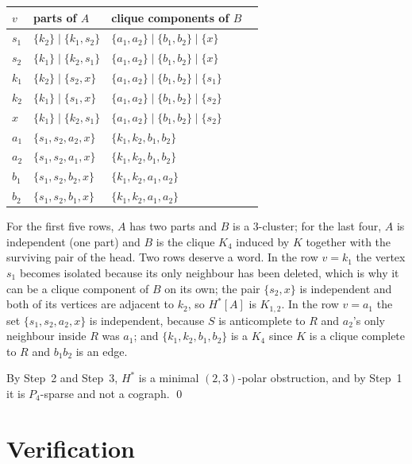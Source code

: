 \documentclass[11pt]{amsart}
\theoremstyle{definition}
\theoremstyle{remark}
\newcommand{\Hstar}{H^{*}}
\begin{document}
\medskip
\begin{center}
\renewcommand{\arraystretch}{1.15}
\begin{tabular}{llll}
$v$ & parts of $A$ & clique components of $B$ & \\
\hline
$s_1$ & $\{k_2\}\mid\{k_1,s_2\}$ & $\{a_1,a_2\}\mid\{b_1,b_2\}\mid\{x\}$ & \\
$s_2$ & $\{k_1\}\mid\{k_2,s_1\}$ & $\{a_1,a_2\}\mid\{b_1,b_2\}\mid\{x\}$ & \\
$k_1$ & $\{k_2\}\mid\{s_2,x\}$   & $\{a_1,a_2\}\mid\{b_1,b_2\}\mid\{s_1\}$ & \\
$k_2$ & $\{k_1\}\mid\{s_1,x\}$   & $\{a_1,a_2\}\mid\{b_1,b_2\}\mid\{s_2\}$ & \\
$x$   & $\{k_1\}\mid\{k_2,s_1\}$ & $\{a_1,a_2\}\mid\{b_1,b_2\}\mid\{s_2\}$ & \\
$a_1$ & $\{s_1,s_2,a_2,x\}$      & $\{k_1,k_2,b_1,b_2\}$ & \\
$a_2$ & $\{s_1,s_2,a_1,x\}$      & $\{k_1,k_2,b_1,b_2\}$ & \\
$b_1$ & $\{s_1,s_2,b_2,x\}$      & $\{k_1,k_2,a_1,a_2\}$ & \\
$b_2$ & $\{s_1,s_2,b_1,x\}$      & $\{k_1,k_2,a_1,a_2\}$ & \\
\end{tabular}
\end{center}

\medskip
For the first five rows, $A$ has two parts and $B$ is a $3$-cluster; for the last four, $A$ is
independent (one part) and $B$ is the clique $K_4$ induced by $K$ together with the surviving
pair of the head. Two rows deserve a word. In the row $v=k_1$ the vertex $s_1$ becomes isolated
because its only neighbour has been deleted, which is why it can be a clique component of $B$
on its own; the pair $\{s_2,x\}$ is independent and both of its vertices are adjacent to $k_2$,
so $\Hstar[A]$ is $K_{1,2}$. In the row $v=a_1$ the set $\{s_1,s_2,a_2,x\}$ is independent,
because $S$ is anticomplete to $R$ and $a_2$'s only neighbour inside $R$ was $a_1$; and
$\{k_1,k_2,b_1,b_2\}$ is a $K_4$ since $K$ is a clique complete to $R$ and $b_1b_2$ is an edge.

By Step~2 and Step~3, $\Hstar$ is a minimal $(2,3)$-polar obstruction, and by Step~1 it is
$P_4$-sparse and not a cograph. \qed

\section{Verification}
\end{document}
